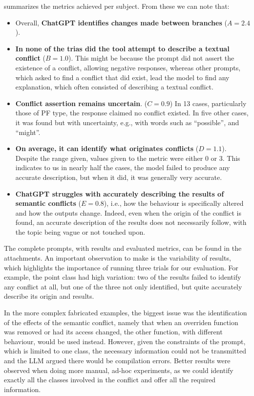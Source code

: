  summarizes the metrics achieved per subject. From these we can note that:

\begin{itemize}
  \item Overall, \textbf{ChatGPT identifies changes made between branches} ($A=2.4$).

  \item \textbf{In none of the trias did the tool attempt to describe a textual conflict} ($B=1.0$). This might be because the prompt did not assert the existence of a conflict, allowing negative responses, whereas other prompts, which asked to find a conflict that did exist, lead the model to find any explanation, which often consisted of describing a textual conflict.

  \item \textbf{Conflict assertion remains uncertain}. ($C=0.9$) In 13 cases, particularly those of PF type, the response claimed no conflict existed. In five other cases, it was found but with uncertainty, e.g., with words such as ``possible'', and ``might''.

  \item \textbf{On average, it can identify what originates conflicts} ($D=1.1$).  Despite the range given, values given to the metric were either 0 or 3. This indicates to us in nearly half the cases, the model failed to produce any accurate description, but when it did, it was generally very accurate.

  \item \textbf{ChatGPT struggles with accurately describing the results of semantic conflicts} ($E=0.8$), i.e., how the behaviour is specifically altered and how the outputs change. Indeed, even when the origin of the conflict is found, an accurate description of the results does not necessarily follow, with the topic being vague or not touched upon.
\end{itemize}

The complete prompts, with results and evaluated metrics, can be found in the attachments.
An important observation to make is the variability of results, which highlights the importance of running three trials for our evaluation.
For example, the point class had high variation: two of the results failed to identify any conflict at all, but one of the three not only identified, but quite accurately describe its origin and results.

In the more complex fabricated examples, the biggest issue was the identification of the effects of the semantic conflict, namely that when an overriden function was removed or had its access changed, the other function, with different behaviour, would be used instead. However, given the constraints of the prompt, which is limited to one class, the necessary information could not be transmitted and the LLM argued there would be compilation errors.
Better results were observed when doing more manual, ad-hoc experiments, as we could identify exactly all the classes involved in the conflict and offer all the required information.

